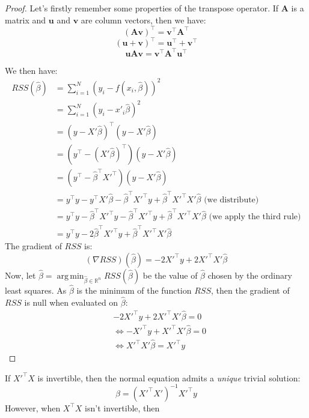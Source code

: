\documentclass{article}
\theoremstyle{definition}
\theoremstyle{remark}
\theoremstyle{example}
\DeclareMathOperator*{\argmin}{arg\,min}
\newcommand{\AAA}{\mathbf{A}}
\newcommand{\uu}{\mathbf{u}}
\newcommand{\vv}{\mathbf{v}}
\newcommand{\betat}{\hat{\beta}}
\begin{document}
\begin{proof} %
		Let's firstly remember some properties of the transpose operator. If $\AAA$ is a matrix and $\uu$ and $\vv$ are column vectors, then we have:
				$$(\AAA\vv)^\top = \vv^\top \AAA^\top$$
				$$(\uu + \vv)^\top = \uu^\top + \vv^\top$$
				$$\uu \AAA \vv = \vv^\top \AAA^\top \uu^\top$$

		We then have:
		\begin{align*}
				RSS(\betat) &= \sum_{i=1}^N (y_i - f(x_i, \betat))^2\\
							&= \sum_{i=1}^N (y_i - x'_i \betat)^2\\
							&= (y - X' \betat)^\top (y - X' \betat)\\
							&= (y^\top - (X' \betat)^\top)(y - X' \betat)\\
							&= (y^\top - \betat^\top X'^\top)(y - X' \betat)\\
							&= y^\top y - y^\top X' \betat - \betat^\top X'^\top y + \betat^\top X'^\top X' \betat \text{ (we distribute)}\\
							&= y^\top y - \betat^\top X'^\top y - \betat^\top X'^\top y + \betat^\top X'^\top X' \betat \text{ (we apply the third rule)}\\
							&= y^\top y - 2 \betat^\top X'^\top y + \betat^\top X'^\top X' \betat
		\end{align*}
		The gradient of $RSS$ is: %
				$$(\nabla RSS)(\betat) = -2X'^\top y + 2X'^\top X' \betat$$
		Now, let $\betat = \argmin_{\betat \in \mathbb{R}^n} RSS(\betat)$ be the value of $\betat$ chosen by the ordinary least squares. As $\betat$ is the minimum of the function $RSS$, then the gradient of $RSS$ is null when evaluated on $\betat$:
		\begin{align*}
				&-2X'^\top y + 2X'^\top X' \betat = 0\\
				&\iff -X'^\top y + X'^\top X' \betat = 0\\
				&\iff X'^\top X' \betat = X'^\top y
		\end{align*}
\end{proof}


If $X'^\top X$ is invertible, then the normal equation admits a \textit{unique} trivial solution:
		$$\betat = (X'^\top X')^{-1}X'^\top y$$
However, when $X^\top X$ isn't invertible, then 
\end{document}
